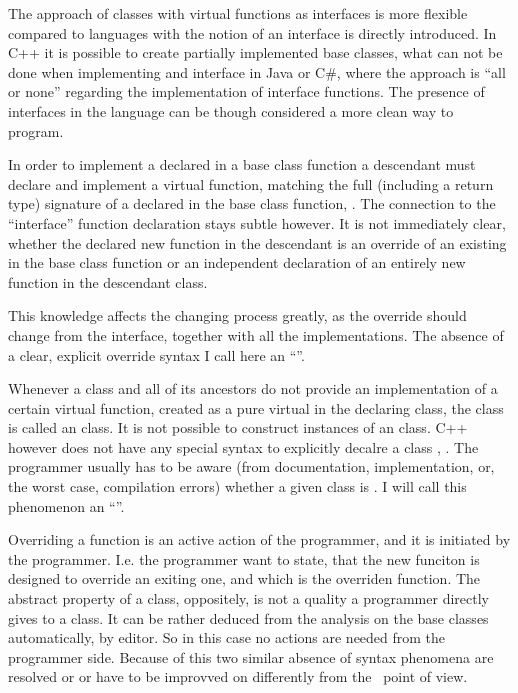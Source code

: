 The approach of classes with virtual functions as interfaces is more flexible compared to languages with the notion 
of an interface is directly introduced.
In C++ it is possible to create partially implemented base classes, what can not be done when implementing
and interface in Java or C\#, where the approach is ``all or none'' regarding the implementation of interface
functions. The presence of interfaces in the language can be though considered a more clean way to program.

In order to implement a declared in a base class function a descendant must declare and implement
a virtual function, matching the full (including a return type) signature of a declared in the base class function, . 
The connection to the ``interface'' function declaration stays subtle however. It is not immediately clear, whether the 
declared new function in the descendant is an override of an existing in the base class function or an independent declaration
of an entirely new function in the descendant class. 

This knowledge affects the changing process greatly, as the override should change from the interface, 
together with all the implementations. The absence of a clear, explicit override syntax I call here an ``''.

Whenever a class and all of its ancestors do not provide an implementation of a certain virtual function,
created as a pure virtual in the declaring class, the class is called an  class. It is not possible
to construct instances of an  class. C++ however does not have any special syntax to explicitly decalre a 
class ,  .
The programmer usually has to be aware (from documentation, implementation, or, the worst case, compilation
errors) whether a given class is . I will call this phenomenon an ``''.

Overriding a function is an active action of the programmer, and it is initiated by the 
programmer. I.e. the programmer want to state, that the new funciton is designed to override an exiting one, and 
which is the overriden function. The abstract property of a class, oppositely, is not a quality a programmer directly
gives to a class. It can be rather deduced from the analysis on the base classes automatically, by editor. So in this case
no actions are needed from the programmer side. Because of this two similar absence of syntax phenomena are resolved or
or have to be improvved on differently from the \pcpp\ point of view.

